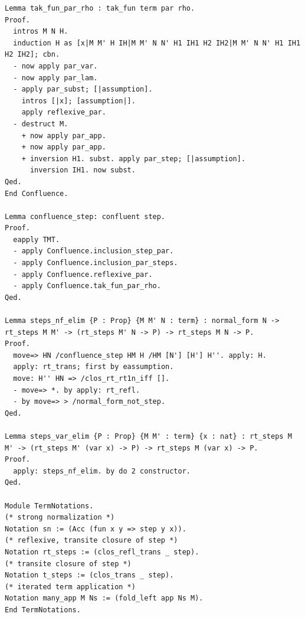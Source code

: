 \begin{lstlisting}
Lemma tak_fun_par_rho : tak_fun term par rho.
Proof.
  intros M N H.
  induction H as [x|M M' H IH|M M' N N' H1 IH1 H2 IH2|M M' N N' H1 IH1 H2 IH2]; cbn.
  - now apply par_var.
  - now apply par_lam.
  - apply par_subst; [|assumption].
    intros [|x]; [assumption|].
    apply reflexive_par.
  - destruct M.
    + now apply par_app.
    + now apply par_app.
    + inversion H1. subst. apply par_step; [|assumption].
      inversion IH1. now subst.
Qed.
End Confluence.

Lemma confluence_step: confluent step.
Proof.
  eapply TMT.
  - apply Confluence.inclusion_step_par.
  - apply Confluence.inclusion_par_steps.
  - apply Confluence.reflexive_par.
  - apply Confluence.tak_fun_par_rho.
Qed.

Lemma steps_nf_elim {P : Prop} {M M' N : term} : normal_form N -> rt_steps M M' -> (rt_steps M' N -> P) -> rt_steps M N -> P.
Proof.
  move=> HN /confluence_step HM H /HM [N'] [H'] H''. apply: H.
  apply: rt_trans; first by eassumption.
  move: H'' HN => /clos_rt_rt1n_iff [].
  - move=> *. by apply: rt_refl.
  - by move=> > /normal_form_not_step.
Qed.

Lemma steps_var_elim {P : Prop} {M M' : term} {x : nat} : rt_steps M M' -> (rt_steps M' (var x) -> P) -> rt_steps M (var x) -> P.
Proof.
  apply: steps_nf_elim. by do 2 constructor.
Qed.

Module TermNotations.
(* strong normalization *)
Notation sn := (Acc (fun x y => step y x)).
(* reflexive, transite closure of step *)
Notation rt_steps := (clos_refl_trans _ step).
(* transite closure of step *)
Notation t_steps := (clos_trans _ step).
(* iterated term application *)
Notation many_app M Ns := (fold_left app Ns M).
End TermNotations.

\end{lstlisting}

